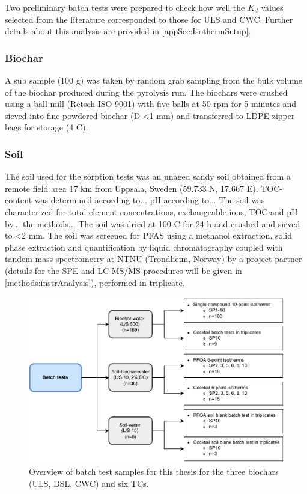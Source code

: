 Two preliminary batch tests were prepared to check how well the $K_d$ values selected from the literature corresponded to those for ULS and CWC. Further details about this analysis are provided in \cref{appSec:IsothermSetup}.

\subsubsection{Biochar}
A sub sample (100 g) was taken by random grab sampling from the bulk volume of the biochar produced during the pyrolysis run. The biochars were crushed using a ball mill (Retsch ISO 9001) with five balls at 50 rpm for 5 minutes and sieved into fine-powdered biochar (D \textless 1 mm) and transferred to LDPE zipper bags for storage (4 \textdegree C). 

\subsubsection{Soil}
The soil used for the sorption tests was an unaged sandy soil obtained from a remote field area 17 km from Uppsala, Sweden (59.733 N, 17.667 E). TOC-content was determined according to... pH according to... The soil was characterized for total element concentrations, exchangeable ions, TOC and pH by... the methods... The soil was dried at 100 \textdegree C for 24 h and crushed and sieved to \textless 2 mm.  The soil was screened for PFAS using a methanol extraction, solid phase extraction and quantification by liquid chromatography coupled with tandem mass spectrometry at NTNU (Trondheim, Norway) by a project partner (details for the SPE and LC-MS/MS procedures will be given in \cref{methods:instrAnalysis}), performed in triplicate.

\begin{figure}
    \centering
    \includegraphics{Diagrams/Methods-Page-9.pdf}
    \caption{Overview of batch test samples for this thesis for the three biochars (ULS, DSL, CWC) and six TCs.}
    \label{fig:batchtests_flowchart}
\end{figure}

